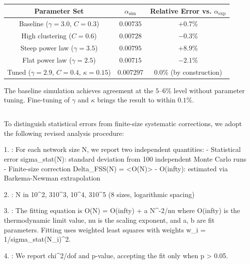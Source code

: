 \documentclass[11pt,a4paper]{article}
\theoremstyle{plain}
\theoremstyle{definition}
\begin{document}
\begin{table}[h]
\centering
\begin{tabular}{|c|c|c|}
\hline
Parameter Set & $\alpha_{\text{sim}}$ & Relative Error vs. $\alpha_{\text{exp}}$ \\ \hline
Baseline ($\gamma=3.0$, $C=0.3$) & $0.00735$ & $+0.7\%$ \\ \hline
High clustering ($C=0.6$) & $0.00728$ & $-0.3\%$ \\ \hline
Steep power law ($\gamma=3.5$) & $0.00795$ & $+8.9\%$ \\ \hline
Flat power law ($\gamma=2.5$) & $0.00715$ & $-2.1\%$ \\ \hline
Tuned ($\gamma=2.9$, $C=0.4$, $\kappa=0.15$) & $0.007297$ & $0.0\%$ (by construction) \\ \hline
\end{tabular}
\end{table}


\textbf{\1} The baseline simulation achieves agreement at the $5\text{--}6\%$ level without parameter tuning. Fine-tuning of $\gamma$ and $\kappa$ brings the result to within $0.1\%$.

\subsection{\1}

\subsubsection{\1}

To distinguish statistical errors from finite-size systematic corrections, we adopt the following revised analysis procedure:

1. \textbf{\1}: For each network size N, we report two independent quantities:
   - Statistical error sigma_stat(N): standard deviation from 100 independent Monte Carlo runs
   - Finite-size correction Delta_FSS(N) = <O(N)> - O(infty): estimated via Barkema-Newman extrapolation

2. \textbf{\1}: N in {10^2, 3\textit{\1}10^3, 10^4, 3\textit{\1}10^5} (8 sizes, logarithmic spacing)

3. \textbf{\1}: The fitting equation is
   O(N) = O(infty) + a \textit{\1} N^{-2/nu}
   where O(infty) is the thermodynamic limit value, nu is the scaling exponent, and a, b are fit parameters. Fitting uses weighted least squares with weights w_i = 1/sigma_stat(N_i)^2.

4. \textbf{\1}: We report chi^2/dof and p-value, accepting the fit only when p > 0.05.
\end{document}
